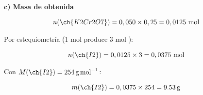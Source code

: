 \begin{exerciseEVAU}
\begin{solu}
        \textbf{c) Masa de  obtenida}

        \begin{equation*}
            n(\ch{K2Cr2O7}) = 0,050 \times 0,25 = 0,0125 \ \text{mol}
        \end{equation*}

        Por estequiometría (1 mol  produce 3 mol ):

        \begin{equation*}
            n(\ch{I2}) = 0,0125 \times 3 = 0,0375 \ \text{mol}
        \end{equation*}

        Con \(M(\ch{I2}) = \SI{254}{\gram\per\mole}\):

        \begin{equation*}
            m(\ch{I2}) = 0,0375 \times 254 = \SI{9.53}{\gram}
        \end{equation*}

    \end{solu}

\end{exerciseEVAU}

